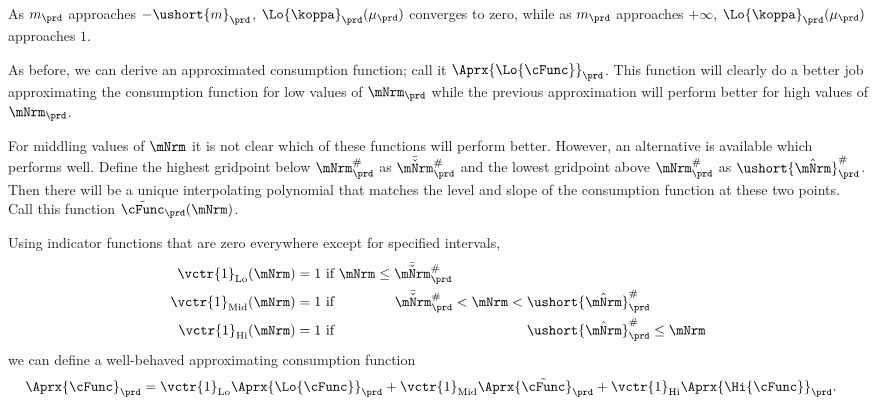   As $m_{\prd}$ approaches
  $-\ushort{m}_{\prd}$, $\Lo{\koppa}_{\prd}(\mu_{\prd})$ converges to zero, while as $m_{\prd}$
  approaches $+\infty$, $\Lo{\koppa}_{\prd}(\mu_{\prd})$ approaches $1$.

  As before, we can derive an approximated consumption function; call it $\Aprx{\Lo{\cFunc}}_{\prd}$.  This function will clearly do a better job approximating the consumption function for low values of $\mNrm_{\prd}$ while the previous approximation will perform better for high values of $\mNrm_{\prd}$.

  For middling values of $\mNrm$ it is not clear which of these functions will perform better.  However, an alternative is available which performs well.  Define the highest gridpoint below $\mtCusp$ as $\bar{\check{\mNrm}}_{\prd}^{\#}$ and the lowest gridpoint above $\mtCusp$ as $\ushort{\hat{\mNrm}}_{\prd}^{\#}$.  Then there will be a unique interpolating polynomial that matches the level and slope of the consumption function at these two points.  Call this function $\tilde{\cFunc}_{\prd}(\mNrm)$.

  Using indicator functions that are zero everywhere except for specified intervals,
  \begin{equation*}\begin{gathered}\begin{aligned}
        \vctr{1}_{\text{Lo}}(\mNrm)  & = 1 \text{~if $          \mNrm \leq  \bar{\check{\mNrm}}_{\prd}^{\#} \phantom{< \mNrm <   \ushort{\hat{\mNrm}}_{\prd}^{\#}          \leq \mNrm}$}
        \\  \vctr{1}_{\text{Mid}}(\mNrm)  & = 1 \text{~if $\phantom{ \mNrm \leq}~ \bar{\check{\mNrm}}_{\prd}^{\#}          < \mNrm <   \ushort{\hat{\mNrm}}_{\prd}^{\#} \phantom{\leq \mNrm}$}
        \\  \vctr{1}_{\text{Hi}}(\mNrm)  & = 1 \text{~if $\phantom{ \mNrm \leq  ~\bar{\check{\mNrm}}_{\prd}^{\#}          < \mNrm < } \ushort{\hat{\mNrm}}_{\prd}^{\#}           \leq \mNrm$}
      \end{aligned}\end{gathered}\end{equation*}
  we can define a well-behaved approximating consumption function
  \begin{equation}\begin{gathered}\begin{aligned}
        \Aprx{\cFunc}_{\prd}  & = \vctr{1}_{\text{Lo}} \Aprx{\Lo{\cFunc}}_{\prd} + \vctr{1}_{\text{Mid}} \Aprx{\tilde{\cFunc}}_{\prd}+\vctr{1}_{\text{Hi}} \Aprx{\Hi{\cFunc}}_{\prd}.
      \end{aligned}\end{gathered}\end{equation}

